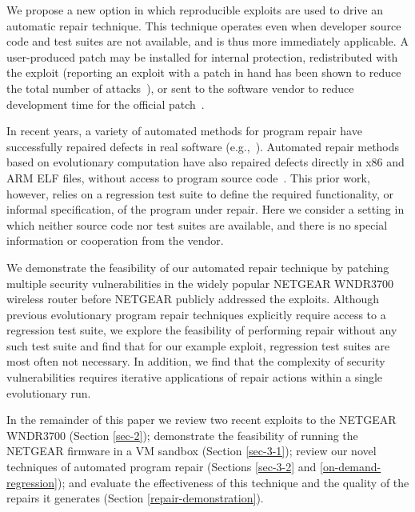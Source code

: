 \documentclass{sigcomm-alternate}
\begin{document}
We propose a new option in which reproducible exploits are used to drive an
automatic repair technique. This technique operates even when developer
source code and test suites are not available, and is thus more immediately
applicable. A user-produced patch may be installed for internal protection,
redistributed with the exploit (reporting an exploit with a patch in hand
has been shown to reduce the total number of attacks~\cite{arora2006does}),
or sent to the software vendor to reduce development time for the official
patch~\cite{weimer06}.

In recent years, a variety of automated methods for program repair
have successfully repaired defects in real software
(e.g.,~\cite{clearview,genprog-tse-journal,par,nguyen2013semfix}).
Automated repair methods based on evolutionary computation have also
repaired defects directly in x86 and ARM ELF files, without access to
program source code~\cite{schulte2013embedded}.  This prior work,
however, relies on a regression test suite to define the required
functionality, or informal specification, of the program under repair.
Here we consider a setting in which neither source code nor test
suites are available, and there is no special information or
cooperation from the vendor.


We demonstrate the feasibility of our automated repair technique by
patching multiple security vulnerabilities in the widely popular NETGEAR
WNDR3700 wireless router before NETGEAR publicly addressed the
exploits.  Although previous evolutionary program repair techniques
explicitly require access to a regression test suite, we explore the
feasibility of performing repair without any such test suite and find
that for our example exploit, regression test suites are most often
not necessary. In addition, we find that the complexity of security
vulnerabilities requires iterative applications of repair actions
within a single evolutionary run.

In the remainder of this paper we review two recent exploits to the
NETGEAR WNDR3700 (Section \ref{sec-2}); demonstrate the feasibility
of running the NETGEAR firmware in a VM sandbox (Section \ref{sec-3-1});
review our novel techniques of automated program repair (Sections
\ref{sec-3-2} and \ref{on-demand-regression}); and evaluate the effectiveness of this
technique and the quality of the repairs it generates (Section
\ref{repair-demonstration}).
\end{document}
